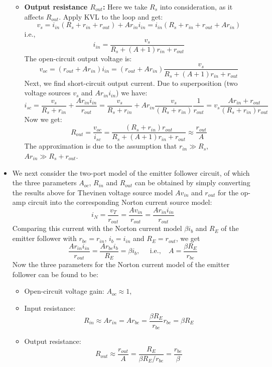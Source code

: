 \begin{itemize}
\begin{itemize}
    \item {\bf Output resistance $R_{out}$:} Here we take $R_s$ into
      consideration, as it affects $R_{out}$. Apply KVL to the loop 
      and get:
      \[ 
      v_s=i_{in} \left(R_s+r_{in}+r_{out}\right)+A r_{in}i_{in}
      =i_{in} \left(R_s+r_{in}+r_{out} +A r_{in}\right)
      \]
      i.e.,
      \[
      i_{in}=\frac{v_s}{R_s+(A+1)r_{in}+r_{out}} 
      \]
      The open-circuit output voltage is:
      \[
      v_{oc}=(r_{out}+Ar_{in}) i_{in}=(r_{out}+Ar_{in}) \frac{v_s}{R_s+(A+1)r_{in}+r_{out}} 
      \]
      Next, we find short-circuit output current. Due to superposition (two voltage 
      sources $v_s$ and $Ar_{in}i_{in}$) we have:
      \[
      i_{sc}=\frac{v_s}{R_s+r_{in}}+\frac{Ar_{in}i_{in}}{r_{out}}
      =\frac{v_s}{R_s+r_{in}}+Ar_{in}\frac{v_s}{(R_s+r_{in})}\frac{1}{r_{out}}
      =v_s\frac{Ar_{in}+r_{out}}{(R_s+r_{in})r_{out}} 
      \]
      Now we get:
      \[
      R_{out}=\frac{v_{oc}}{i_{sc}}=\frac{(R_s+r_{in})r_{out}}{R_s+(A+1)r_{in}+r_{out}}
      \approx \frac{r_{out}}{A}
      \]
      The approximation is due to the assumption that $r_{in}\gg R_s$,
      $Ar_{in}\gg R_s+r_{out}$.
	      
  \end{itemize}
\item We next consider the two-port model of the emitter follower 
  circuit, of which the three parameters $A_{oc}$, $R_{in}$ and $R_{out}$ 
  can be obtained by simply converting the results above for Thevinen
  voltage source model $Av_{in}$ and $r_{out}$ for the op-amp circuit into
  the corresponding Norton current source model:
  \[
  i_N=\frac{v_T}{r_{out}}=\frac{Av_{in}}{r_{out}}=\frac{Ar_{in}i_{in}}{r_{out}}
  \]
  Comparing this current with the Norton current model $\beta i_b$ and $R_E$
  of the emitter follower with $r_{be}=r_{in}$, $i_b=i_{in}$ and $R_E=r_{out}$,
  we get
  \[
  \frac{Ar_{in}i_{in}}{r_{out}}=\frac{Ar_{be}i_b}{R_E}=\beta i_b,
  \;\;\;\;\;\mbox{i.e.,}\;\;\;\;A=\frac{\beta R_E}{r_{be}}
  \]
  Now the three parameters for the Norton current model of the emitter
  follower can be found to be:
  \begin{itemize}
  \item Open-circuit voltage gain: $A_{oc}\approx 1$,
  \item Input resistance:
    \[ R_{in}\approx Ar_{in}=Ar_{be}=\frac{\beta R_E}{r_{be}}r_{be}=\beta R_E \]
  \item Output resistance:
    \[ R_{out}\approx \frac{r_{out}}{A}=\frac{R_E}{\beta R_E/r_{be}}=\frac{r_{be}}{\beta} \]
  \end{itemize}

  \end{itemize}



